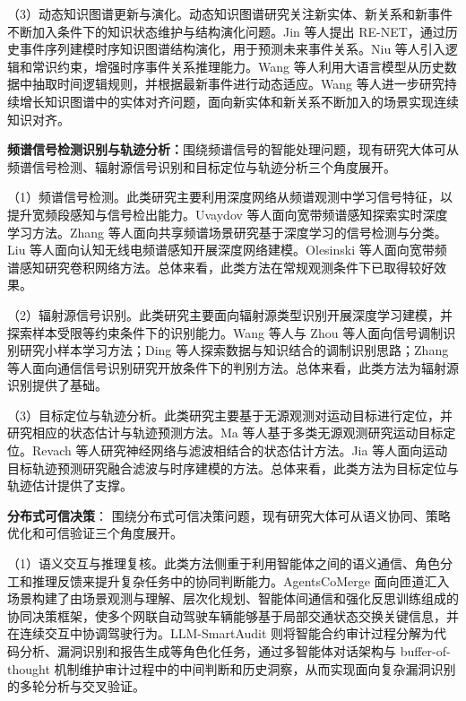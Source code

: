 （3）动态知识图谱更新与演化。动态知识图谱研究关注新实体、新关系和新事件不断加入条件下的知识状态维护与结构演化问题。Jin 等人\cite{jin2020recurrent}提出 RE-NET，通过历史事件序列建模时序知识图谱结构演化，用于预测未来事件关系。Niu 等人\cite{DBLP:conf/aaai/NiuL23}引入逻辑和常识约束，增强时序事件关系推理能力。Wang 等人\cite{DBLP:conf/nips/WangSLWHLPY24}利用大语言模型从历史数据中抽取时间逻辑规则，并根据最新事件进行动态适应。Wang 等人\cite{DBLP:conf/semweb/WangCLSJHH22}进一步研究持续增长知识图谱中的实体对齐问题，面向新实体和新关系不断加入的场景实现连续知识对齐。



\textbf{频谱信号检测识别与轨迹分析：}围绕频谱信号的智能处理问题，现有研究大体可从频谱信号检测、辐射源信号识别和目标定位与轨迹分析三个角度展开。


（1）频谱信号检测。此类研究主要利用深度网络从频谱观测中学习信号特征，以提升宽频段感知与信号检出能力。Uvaydov 等人\cite{uvaydov2021deepsense}面向宽带频谱感知探索实时深度学习方法。Zhang 等人\cite{ZhangFKA21}面向共享频谱场景研究基于深度学习的信号检测与分类。Liu 等人\cite{DBLP:journals/jsac/LiuWLL19}面向认知无线电频谱感知开展深度网络建模。Olesinski 等人\cite{DBLP:journals/sensors/OlesinskiP23}面向宽带频谱感知研究卷积网络方法。总体来看，此类方法在常规观测条件下已取得较好效果。

（2）辐射源信号识别。此类研究主要面向辐射源类型识别开展深度学习建模，并探索样本受限等约束条件下的识别能力。Wang 等人\cite{DBLP:journals/tsp/WangBXZJ22}与 Zhou 等人\cite{DBLP:journals/icl/ZhouZMZZJ22}面向信号调制识别研究小样本学习方法；Ding 等人\cite{DBLP:conf/icc/DingZZWH22}探索数据与知识结合的调制识别思路；Zhang 等人\cite{zhang2022openset}面向通信信号识别研究开放条件下的判别方法。总体来看，此类方法为辐射源识别提供了基础。

（3）目标定位与轨迹分析。此类研究主要基于无源观测对运动目标进行定位，并研究相应的状态估计与轨迹预测方法。Ma 等人\cite{ma2022altitude}基于多类无源观测研究运动目标定位。Revach 等人\cite{revach2022kalmannet}研究神经网络与滤波相结合的状态估计方法。Jia 等人\cite{jia2025kalmangru}面向运动目标轨迹预测研究融合滤波与时序建模的方法。总体来看，此类方法为目标定位与轨迹估计提供了支撑。

\textbf{分布式可信决策}：
围绕分布式可信决策问题，现有研究大体可从语义协同、策略优化和可信验证三个角度展开。

（1）语义交互与推理复核。此类方法侧重于利用智能体之间的语义通信、角色分工和推理反馈来提升复杂任务中的协同判断能力。AgentsCoMerge\cite{10976336} 面向匝道汇入场景构建了由场景观测与理解、层次化规划、智能体间通信和强化反思训练组成的协同决策框架，使多个网联自动驾驶车辆能够基于局部交通状态交换关键信息，并在连续交互中协调驾驶行为。LLM-SmartAudit\cite{11121619} 则将智能合约审计过程分解为代码分析、漏洞识别和报告生成等角色化任务，通过多智能体对话架构与 buffer-of-thought 机制维护审计过程中的中间判断和历史洞察，从而实现面向复杂漏洞识别的多轮分析与交叉验证。

